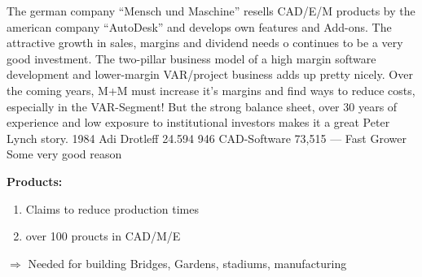 \documentclass{company_analysis}
\begin{document}


\story
    {The german company \enquote{Mensch und Maschine} resells CAD/E/M
    products by the american company \enquote{AutoDesk} and develops
    own features and Add-ons. The attractive growth in sales, margins
    and dividend needs o continues to be a very good investment. The
    two-pillar business model of a high margin software development and
    lower-margin VAR/project business adds up pretty nicely. Over the
    coming years, M+M must increase it's margins and find ways to reduce
    costs, especially in the VAR-Segment! But the strong balance sheet,
    over 30 years of experience and low exposure to institutional investors
    makes it a great Peter Lynch story.}
\infosection
    {1984}
    {Adi Drotleff}
    {24.594}
    {946}
    {CAD-Software}
    {73,515}
    {---}
    {Fast Grower}
    {Some very good reason}



\begin{minipage}{.6\linewidth}
    \faArchive\space\textbf{Products:}
    \begin{enumerate}
        \item Claims to reduce production times
        \item over 100 proucts in CAD/M/E
    \end{enumerate}
    $\Rightarrow$ Needed for building Bridges, Gardens, stadiums, manufacturing
\end{minipage}
\end{document}

